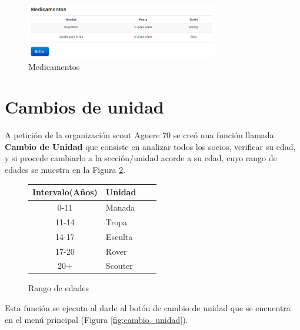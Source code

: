 \begin{figure}[H]
\begin{center}
\includegraphics[width=0.75\textwidth]{images/medicamentos.jpg}
\caption{Medicamentos}
\label{fig:medicamentos}
\end{center}
\end{figure}

\section{Cambios de unidad}
\label{3:sec3}

A petición de la organización scout Aguere 70 se creó una función llamada \textbf{Cambio de Unidad} que consiste en analizar todos los socios, verificar su edad, y si procede cambiarlo a la sección/unidad acorde a su edad,
cuyo rango de edades se muestra en la Figura \ref{fig:rango}.\\

\begin{figure}[H]
\begin{center}
\begin{tabular}{c|p{25mm}c|p{25mm}|} \hline 
\textbf{Intervalo(Años)} & \textbf{Unidad} \\ \hline
0-11 &
Manada
\\
\hline

11-14 &
Tropa
\\
\hline

14-17 &
Esculta
\\
\hline

17-20 &
Rover
\\
\hline

20+ & 
Scouter
\\
\hline
\end{tabular}
\caption{Rango de edades}
\label{fig:rango}
\end{center}
\end{figure}

Esta función se ejecuta al darle al botón de cambio de unidad que se encuentra en el menú principal (Figura \ref{fig:cambio_unidad}).\\


